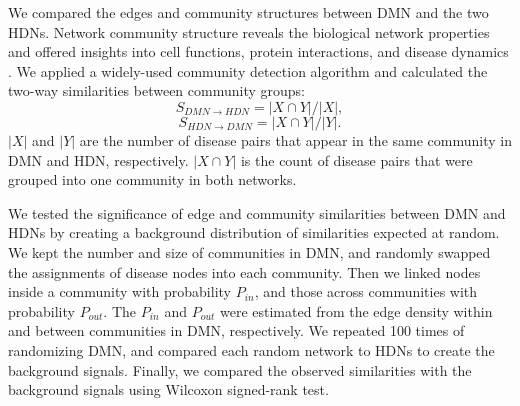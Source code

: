 We compared the edges and community structures between DMN and the two HDNs.
Network community structure reveals the biological network properties
and offered insights into cell functions, protein interactions, and disease dynamics
\cite{caretta2007bottleneck, palla2005uncovering, salathe2010dynamics}.
We applied a widely-used community detection algorithm \cite{newman2004finding}
and calculated the two-way similarities between community groups:
\begin{equation}
S_{DMN \to HDN}  =|X \cap Y|/|X|, \label{wallace1}
\end{equation}
\begin{equation}
S_{HDN \to DMN} =|X \cap Y|/|Y|. \label{wallace2}
\end{equation}
$|X|$ and $|Y|$ are the number of disease pairs that appear in the same community in DMN and HDN, respectively.
$|X \cap Y|$ is the count of disease pairs that were grouped into one community in both networks.

We tested the significance of edge and community similarities between DMN and HDNs
by creating a background distribution of similarities expected at random.
We kept the number and size of communities in DMN, and randomly swapped the assignments of disease nodes into each community.
Then we linked nodes inside a community with probability $P_{in}$, and those across communities with
probability $P_{out}$.
The $P_{in}$ and $P_{out}$ were estimated from the edge density
within and between communities in DMN, respectively.
We repeated 100 times of randomizing DMN, and compared each random network to HDNs to create the background signals.
Finally, we compared the observed similarities with the background signals using Wilcoxon signed-rank test.

